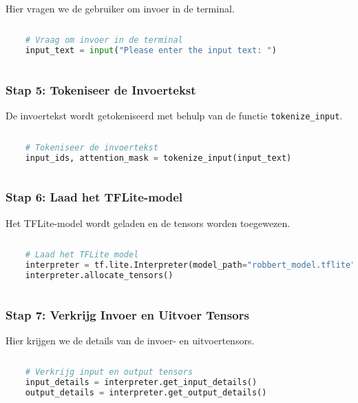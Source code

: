 Hier vragen we de gebruiker om invoer in de terminal.

\begin{lstlisting}[language=Python, caption={Vraag om invoer in de terminal}]
    
    # Vraag om invoer in de terminal
    input_text = input("Please enter the input text: ")
    
\end{lstlisting}

\subsubsection{Stap 5: Tokeniseer de Invoertekst}

De invoertekst wordt getokeniseerd met behulp van de functie \texttt{tokenize\_input}.

\begin{lstlisting}[language=Python, caption={Tokeniseer de invoertekst}]
    
    # Tokeniseer de invoertekst
    input_ids, attention_mask = tokenize_input(input_text)
    
\end{lstlisting}

\subsubsection{Stap 6: Laad het TFLite-model}

Het TFLite-model wordt geladen en de tensors worden toegewezen.

\begin{lstlisting}[language=Python, caption={Laad het TFLite-model}]
    
    # Laad het TFLite model
    interpreter = tf.lite.Interpreter(model_path="robbert_model.tflite")
    interpreter.allocate_tensors()
    
\end{lstlisting}

\subsubsection{Stap 7: Verkrijg Invoer en Uitvoer Tensors}

Hier krijgen we de details van de invoer- en uitvoertensors.

\begin{lstlisting}[language=Python, caption={Verkrijg invoer en uitvoer tensors}]
    
    # Verkrijg input en output tensors
    input_details = interpreter.get_input_details()
    output_details = interpreter.get_output_details()
    
\end{lstlisting}

